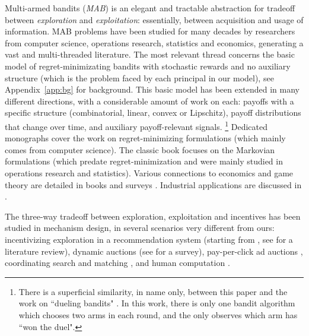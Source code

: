  Multi-armed bandits (\emph{MAB}) is an elegant and tractable abstraction for tradeoff between \emph{exploration} and \emph{exploitation}: essentially, between acquisition and usage of information. MAB problems have been studied for many decades by researchers from computer science, operations research, statistics and economics, generating a vast and multi-threaded literature.  The most relevant thread concerns the basic model of regret-minimizating bandits with stochastic rewards and no auxiliary structure (which is the problem faced by each principal in our model), see Appendix~\ref{app:bg} for background. This basic model has been extended in many different directions, with a considerable amount of work on each: \eg payoffs with a specific structure (\eg combinatorial, linear, convex or Lipschitz), payoff distributions that change over time, and auxiliary payoff-relevant signals.%
\footnote{There is a superficial similarity, in name only, between this paper and the work on ``dueling bandits" \citep[starting from][]{Yue-dueling12,Yue-dueling-icml09}.
In this work, there is only one bandit algorithm which chooses two arms in each round, and the only observes which arm has ``won the duel".}
Dedicated monographs \citep{Bubeck-survey12,slivkins-MABbook,LS19bandit-book} cover the work on regret-minimizing formulations (which mainly comes from computer science). The classic book
\citep{Gittins-book11} focuses on the Markovian formulations (which predate regret-minimization and were mainly studied in operations research and statistics).
Various connections to economics and game theory are detailed in
books \citep{CesaBL-book,slivkins-MABbook} and surveys \citep{Bergemann-survey06,Horner-survey16}. Industrial applications are discussed in \citep{DS-arxiv}.

The three-way tradeoff between exploration, exploitation and incentives has been studied in mechanism design, in several scenarios very different from ours:
incentivizing exploration in a recommendation system
(starting from \citet{Kremer-JPE14}, see \citet[Ch. 11.6]{slivkins-MABbook} for a literature review),
dynamic auctions
    (\eg see \citet{DynAuctions-survey10} for a survey),
pay-per-click ad auctions
    \citep[\eg][]{MechMAB-ec09,DevanurK09,Transform-ec10-jacm},
coordinating search and matching
    \citep{Bobby-Glen-ec16},
and human computation
    \citep[\eg][]{RepeatedPA-ec14,Ghosh-itcs13,Krause-www13}.

